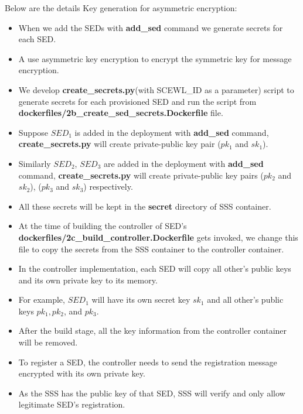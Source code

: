 \documentclass[11pt,oneside,onecolumn,letterpaper]{article}
\begin{document}

Below are the details Key generation for asymmetric encryption:
\begin{itemize}
  \item When we add the SEDs with \textbf{add\_sed}  
      command we generate secrets for each SED. 
      \item A use asymmetric key encryption to encrypt the symmetric key for message encryption.
      \item We develop \textbf{create\_secrets.py}(with SCEWL\_ID as a parameter) script to generate secrets for each provisioned SED and run the script from  \textbf{dockerfiles/2b\_create\_sed\_secrets.Dockerfile} file.
       \item  Suppose $SED_1$ is added in the deployment with \textbf{add\_sed} command, \textbf{create\_secrets.py} will create private-public key pair ($pk_1$ and $sk_1$).
      \item Similarly $SED_2$,  $SED_3$ are added in the deployment with \textbf{add\_sed} command, \textbf{create\_secrets.py} will create private-public key pairs ($pk_2$ and $sk_2$), ($pk_3$ and $sk_3$) respectively.
      \item All these secrets will be kept in the \textbf{secret} directory of SSS container.
      \item At the time of building the controller of SED's \textbf{dockerfiles/2c\_build\_controller.Dockerfile}  gets invoked, we change this file to copy the secrets from the SSS container to the controller container.
      \item In the controller implementation, each SED will copy all other's public keys and its own private key to its memory.
      \item For example,  $SED_1$ will have its own secret key $sk_1$ and all other's public keys $pk_1, pk_2$, and $pk_3$.
      \item After the build stage, all the key information from the controller container will be removed. 
      \item To register a SED, the controller needs to send the registration message encrypted with its own private key.
      \item As the SSS has the public key of that SED, SSS will verify and only allow legitimate SED's registration. 

\end{itemize}
\end{document}
